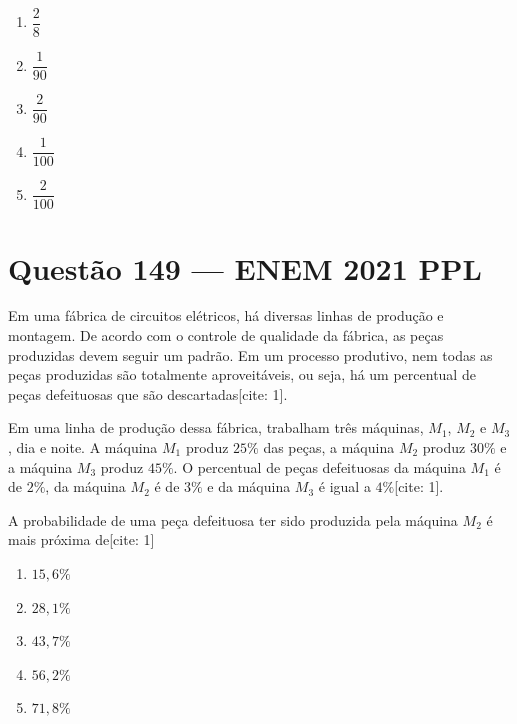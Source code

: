 \documentclass[11pt,a4paper]{article}
\begin{document}
\begin{enumerate}[label=(\Alph*)]
    \item $\dfrac{2}{8}$
    \item $\dfrac{1}{90}$
    \item $\dfrac{2}{90}$
    \item $\dfrac{1}{100}$
    \item $\dfrac{2}{100}$
\end{enumerate}

\section*{Questão 149 --- ENEM 2021 PPL}

Em uma fábrica de circuitos elétricos, há diversas linhas de produção e montagem. De acordo com o controle de qualidade da fábrica, as peças produzidas devem seguir um padrão. Em um processo produtivo, nem todas as peças produzidas são totalmente aproveitáveis, ou seja, há um percentual de peças defeituosas que são descartadas[cite: 1].

Em uma linha de produção dessa fábrica, trabalham três máquinas, $M_1$, $M_2$ e $M_3$, dia e noite. A máquina $M_1$ produz $25\%$ das peças, a máquina $M_2$ produz $30\%$ e a máquina $M_3$ produz $45\%$. O percentual de peças defeituosas da máquina $M_1$ é de $2\%$, da máquina $M_2$ é de $3\%$ e da máquina $M_3$ é igual a $4\%$[cite: 1].

A probabilidade de uma peça defeituosa ter sido produzida pela máquina $M_2$ é mais próxima de[cite: 1]

\begin{enumerate}[label=(\Alph*)]
    \item $15{,}6\%$
    \item $28{,}1\%$
    \item $43{,}7\%$
    \item $56{,}2\%$
    \item $71{,}8\%$
\end{enumerate}
\end{document}

